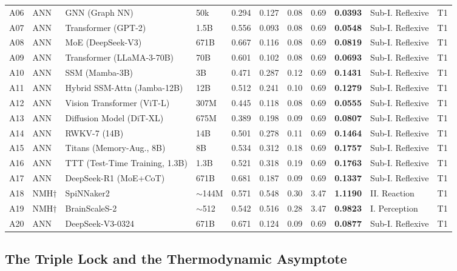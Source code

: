 \documentclass[12pt]{article}
\begin{document}
\begin{longtable}{p{0.6cm}p{0.7cm}p{3.2cm}p{1.0cm}p{0.7cm}p{0.7cm}p{0.7cm}p{0.7cm}p{0.9cm}p{1.8cm}p{0.5cm}}
A06 & ANN & GNN (Graph NN) & 50k & 0.294 & 0.127 & 0.08 & 0.69 & \textbf{0.0393} & Sub-I. Reflexive & T1 \\
A07 & ANN & Transformer (GPT-2) & 1.5B & 0.556 & 0.093 & 0.08 & 0.69 & \textbf{0.0548} & Sub-I. Reflexive & T1 \\
A08 & ANN & MoE (DeepSeek-V3) & 671B & 0.667 & 0.116 & 0.08 & 0.69 & \textbf{0.0819} & Sub-I. Reflexive & T1 \\
A09 & ANN & Transformer (LLaMA-3-70B) & 70B & 0.601 & 0.102 & 0.08 & 0.69 & \textbf{0.0693} & Sub-I. Reflexive & T1 \\
A10 & ANN & SSM (Mamba-3B) & 3B & 0.471 & 0.287 & 0.12 & 0.69 & \textbf{0.1431} & Sub-I. Reflexive & T1 \\
A11 & ANN & Hybrid SSM-Attn (Jamba-12B) & 12B & 0.512 & 0.241 & 0.10 & 0.69 & \textbf{0.1279} & Sub-I. Reflexive & T1 \\
A12 & ANN & Vision Transformer (ViT-L) & 307M & 0.445 & 0.118 & 0.08 & 0.69 & \textbf{0.0555} & Sub-I. Reflexive & T1 \\
A13 & ANN & Diffusion Model (DiT-XL) & 675M & 0.389 & 0.198 & 0.09 & 0.69 & \textbf{0.0807} & Sub-I. Reflexive & T1 \\
A14 & ANN & RWKV-7 (14B) & 14B & 0.501 & 0.278 & 0.11 & 0.69 & \textbf{0.1464} & Sub-I. Reflexive & T1 \\
A15 & ANN & Titans (Memory-Aug., 8B) & 8B & 0.534 & 0.312 & 0.18 & 0.69 & \textbf{0.1757} & Sub-I. Reflexive & T1 \\
A16 & ANN & TTT (Test-Time Training, 1.3B) & 1.3B & 0.521 & 0.318 & 0.19 & 0.69 & \textbf{0.1763} & Sub-I. Reflexive & T1 \\
A17 & ANN & DeepSeek-R1 (MoE+CoT) & 671B & 0.681 & 0.187 & 0.09 & 0.69 & \textbf{0.1337} & Sub-I. Reflexive & T1 \\
A18 & NMH$\dagger$ & SpiNNaker2 & $\sim$144M & 0.571 & 0.548 & 0.30 & 3.47 & \textbf{1.1190} & II. Reaction & T1 \\
A19 & NMH$\dagger$ & BrainScaleS-2 & $\sim$512 & 0.542 & 0.516 & 0.28 & 3.47 & \textbf{0.9823} & I. Perception & T1 \\
A20 & ANN & DeepSeek-V3-0324 & 671B & 0.671 & 0.124 & 0.09 & 0.69 & \textbf{0.0877} & Sub-I. Reflexive & T1 \\
\end{longtable}

\subsection{The Triple Lock and the Thermodynamic Asymptote}
\end{document}
